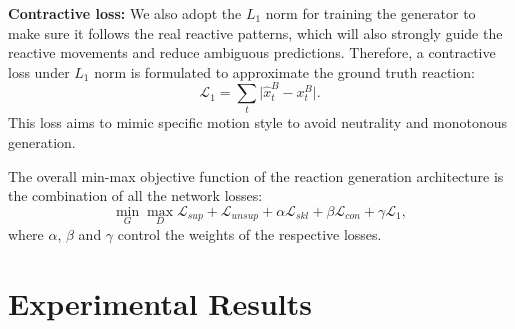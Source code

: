 \documentclass[times,twocolumn,final]{elsarticle}
\begin{document}
\textbf{Contractive loss:} We also adopt the $L_{1}$ norm for training the generator to make sure it follows the real reactive patterns, which will also strongly guide the reactive movements and reduce ambiguous predictions. 
Therefore, a contractive loss under $L_{1}$ norm is formulated to approximate the ground truth reaction:
\begin{equation}
\mathcal{L}_{1}=\sum_{t}\vert \hat{x}_{t}^{B}-x_{t}^{B}\vert.
\end{equation}
This loss aims to mimic specific motion style to avoid neutrality and monotonous generation. %

The overall min-max objective function of the reaction generation architecture is the combination of all the network losses:
\begin{equation}
\min\limits_{G}\max\limits_{D}\mathcal{L}_{sup}+\mathcal{L}_{unsup}+\alpha\mathcal{L}_{skl}+\beta\mathcal{L}_{con}+\gamma\mathcal{L}_{1},\label{eq:overall}
\end{equation}
where $\alpha$, $\beta$ and $\gamma$ control the weights of the respective losses.


\section{Experimental Results}
\label{sec:experiment}
\end{document}
